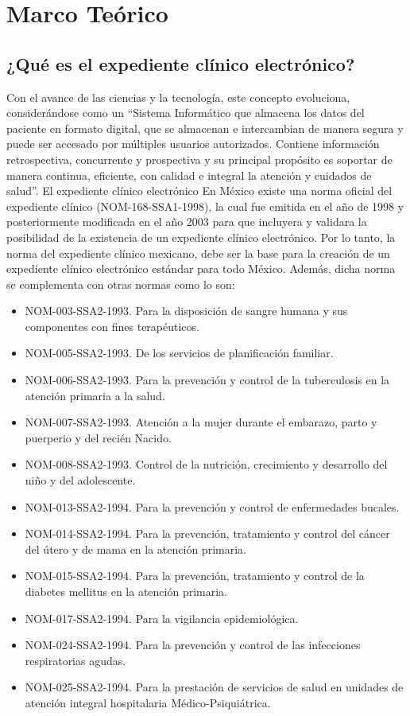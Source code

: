 \chapter{Marco Teórico}

\section{¿Qué es el expediente clínico electrónico?}

Con el avance de las ciencias y la tecnología, este concepto evoluciona, considerándose como un “Sistema Informático que almacena los datos del paciente en formato digital, que se almacenan e intercambian de manera segura y puede ser accesado por múltiples usuarios autorizados. Contiene información retrospectiva, concurrente y prospectiva y su principal propósito es soportar de manera continua, eficiente, con calidad e integral la atención y cuidados de salud”. \cite{marco1}
El expediente clínico electrónico
En México existe una norma oficial del expediente clínico (NOM-168-SSA1-1998), la cual fue emitida en el año de 1998 y posteriormente modificada en el año 2003 para que incluyera y validara la posibilidad de la existencia de un expediente clínico electrónico. Por lo tanto, la norma del expediente clínico mexicano, debe ser la base para la creación de un expediente clínico electrónico estándar para todo México. Además, dicha norma se complementa con otras normas como lo son:
\begin{itemize}
  \item NOM-003-SSA2-1993. Para la disposición de sangre humana y sus componentes con fines terapéuticos.
  \item NOM-005-SSA2-1993. De los servicios de planificación familiar.
  \item NOM-006-SSA2-1993. Para la prevención y control de la tuberculosis en la atención primaria a la salud.
  \item NOM-007-SSA2-1993. Atención a la mujer durante el embarazo, parto y puerperio y del recién Nacido.
  \item NOM-008-SSA2-1993. Control de la nutrición, crecimiento y desarrollo del niño y del adolescente.
  \item NOM-013-SSA2-1994. Para la prevención y control de enfermedades bucales.
  \item NOM-014-SSA2-1994. Para la prevención, tratamiento y control del cáncer del útero y de mama en la atención primaria.
  \item NOM-015-SSA2-1994. Para la prevención, tratamiento y control de la diabetes mellitus en la atención primaria.
  \item NOM-017-SSA2-1994. Para la vigilancia epidemiológica.
  \item NOM-024-SSA2-1994. Para la prevención y control de las infecciones respiratorias agudas.
  \item NOM-025-SSA2-1994. Para la prestación de servicios de salud en unidades de atención integral hospitalaria Médico-Psiquiátrica. \cite{marco2}

\end{itemize}

